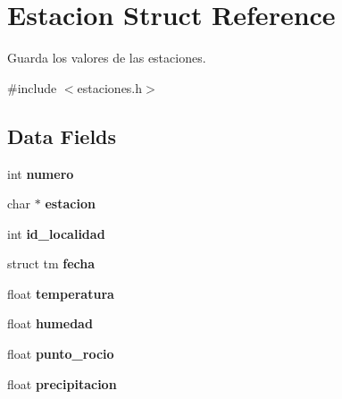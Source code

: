 \hypertarget{struct_estacion}{}\section{Estacion Struct Reference}
\label{struct_estacion}


Guarda los valores de las estaciones.  




{\ttfamily \#include $<$estaciones.\+h$>$}

\subsection*{Data Fields}
\begin{DoxyCompactItemize}
\item 
int {\bfseries numero}\hypertarget{struct_estacion_a2c30f43104974e72e2809fb4569804b0}{}\label{struct_estacion_a2c30f43104974e72e2809fb4569804b0}

\item 
char $\ast$ {\bfseries estacion}\hypertarget{struct_estacion_a04c6823328ab43565fb83f59e72e07dd}{}\label{struct_estacion_a04c6823328ab43565fb83f59e72e07dd}

\item 
int {\bfseries id\+\_\+localidad}\hypertarget{struct_estacion_a15d6364dafe12a21cfa16dcdf7b4c490}{}\label{struct_estacion_a15d6364dafe12a21cfa16dcdf7b4c490}

\item 
struct tm {\bfseries fecha}\hypertarget{struct_estacion_afe486c34bd1b7505b25a9cc526aec350}{}\label{struct_estacion_afe486c34bd1b7505b25a9cc526aec350}

\item 
float {\bfseries temperatura}\hypertarget{struct_estacion_a8347aeb522c9e13e9f376640fad780e7}{}\label{struct_estacion_a8347aeb522c9e13e9f376640fad780e7}

\item 
float {\bfseries humedad}\hypertarget{struct_estacion_a34280c09711b9f4f72211e5c467b57bf}{}\label{struct_estacion_a34280c09711b9f4f72211e5c467b57bf}

\item 
float {\bfseries punto\+\_\+rocio}\hypertarget{struct_estacion_ab67358f4698862a2d475ac18e89dd00b}{}\label{struct_estacion_ab67358f4698862a2d475ac18e89dd00b}

\item 
float {\bfseries precipitacion}\hypertarget{struct_estacion_abc60df6e6dbfecbc25cfdffef13a4265}{}\label{struct_estacion_abc60df6e6dbfecbc25cfdffef13a4265}


\end{DoxyCompactItemize}
